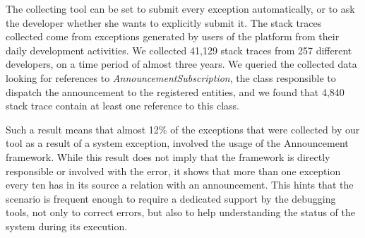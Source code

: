 
%


The collecting tool can be set to submit every exception automatically, or to ask the developer whether she wants to explicitly submit it.
The stack traces collected come from exceptions generated by users of the \pha platform from their daily development activities.
We collected 41,129 stack traces from 257 different developers, on a time period of almost three years.
We queried the collected data looking for references to \textit{AnnouncementSubscription}, the class responsible to dispatch the announcement to the registered entities, and we found that 4,840 stack trace contain at least one reference to this class.

Such a result means that almost 12\% of the exceptions that were collected by our tool as a result of a system exception, involved the usage of the Announcement framework.
While this result does not imply that the framework is directly responsible or involved with the error, it shows that more than one exception every ten has in its source a relation with an announcement.
This hints that the scenario is frequent enough to require a dedicated support by the debugging tools, not only to correct errors, but also to help understanding the status of the system during its execution.


